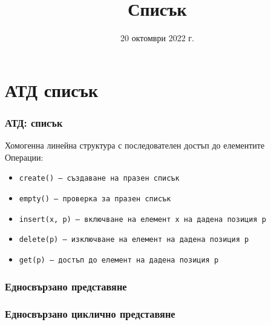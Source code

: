 \documentclass[alsotrans]{beamerswitch}
\title{Списък}
\date{20 октомври 2022 г.}
\newcommand{\linkedchain}{
  \doublecell{a1}{a_1}
  \nextdoublecell{a2}{a_2}{a1}
  \nextdots{a2}
  \dotsnextdoublecell{an-1}{a_{n-1}}
  \nextdoublecell{an}{a_n}{an-1}
}
\begin{document}
\begin{frame}
  \titlepage
\end{frame}

\section{АТД списък}

\begin{frame}
  \frametitle{АТД: списък}

  Хомогенна линейна структура с последователен достъп до елементите\\[2ex]
  Операции:\\[1ex]
  \begin{itemize}
  \item \tt{create()} --- създаване на празен списък
  \item \tt{empty()} --- проверка за празен списък
  \item \tt{insert(x, p)} --- включване на елемент \tt x на дадена позиция \tt p
  \item \tt{delete(p)} --- изключване на елемент на дадена позиция \tt p
  \item \tt{get(p)} --- достъп до елемент на дадена позиция \tt p
  \end{itemize}
\end{frame}

\begin{frame}
  \frametitle{Едносвързано представяне}

  \begin{center}
  \end{center}
\end{frame}

\begin{frame}
  \frametitle{Едносвързано циклично представяне}

  \begin{center}
    \small
  \end{center}
\end{frame}
\end{document}
